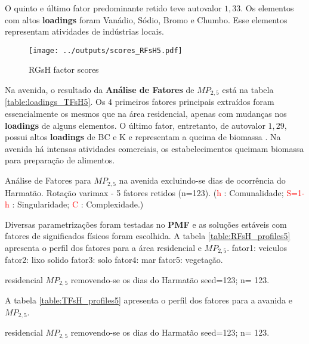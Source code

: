 O quinto e último fator predominante retido teve autovalor $1,33$. 
Os elementos com altos \textbf{loadings} foram Vanádio, Sódio, Bromo e Chumbo.
Esse elementos representam atividades de indústrias locais. 

\begin{figure}[H]
  \centering
  \texttt{[image: ../outputs/scores\_RFsH5.pdf]}
  \caption{RGsH factor scores}
\end{figure}

Na avenida, o resultado da \textbf{Análise de Fatores} de $MP_{2,5}$ está na 
tabela \ref{table:loadings_TFsH5}. Os 4 primeiros fatores principais extraídos 
foram essencialmente os mesmos que na área residencial, apenas com mudanças nos 
\textbf{loadings} de alguns elementos. O último fator, entretanto, de autovalor
$1,29$, possui altos \textbf{loadings} de BC e K e representam a queima de 
biomassa \citep{reid2005}. Na avenida há intensas atividades comerciais, 
os estabelecimentos queimam biomassa para preparação de alimentos.   

\begin{table}[H]
  
  \caption{Análise de Fatores para $MP_{2,5}$ na avenida
           excluindo-se dias de ocorrência do Harmatão.
           Rotação varimax - 5 fatores retidos (n=123).
           (\textcolor{red}{h} : Comunalidade; 
           \textcolor{red}{S=1-h} : Singularidade; 
           \textcolor{red}{C} : Complexidade.)
           \label{table:loadings_TFsH5}}
\end{table}


Diversas parametrizações foram testadas no \textbf{PMF} e as soluções estáveis 
com fatores de significados físicos foram escolhida. 
A tabela \ref{table:RFsH_profiles5} apresenta o perfil dos fatores para a área
residencial e $MP_{2,5}$. 
fator1: veiculos
fator2: lixo solido
fator3: solo
fator4: mar
fator5: vegetação.

\begin{table}[H]
  \centering
    
    \caption{residencial $MP_{2,5}$ removendo-se os dias do Harmatão 
              seed=123; n= 123. 
             \label{table:RFsH_profiles5}}
\end{table}

A tabela \ref{table:TFsH_profiles5} apresenta o perfil dos fatores para a avanida
e $MP_{2,5}$.

\begin{table}[H]
  \centering
    
    \caption{residencial $MP_{2,5}$ removendo-se os dias do Harmatão 
              seed=123; n= 123. 
             \label{table:TFsH_profiles5}}
\end{table}

